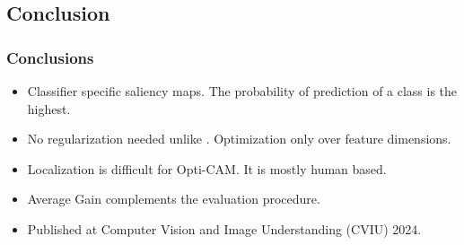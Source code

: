 \subsection*{Conclusion}
\begin{frame}
    \frametitle{Conclusions}
    \small
    \begin{itemize}
        \item Classifier specific saliency maps. The probability of prediction of a class is the highest.
        \item No regularization needed unlike \cite{fong2017interpretable,fong2019understanding}. 
        Optimization only over feature dimensions.
        \item Localization is difficult for Opti-CAM. It is mostly human based.
        \item Average Gain complements the evaluation procedure. 
        \item Published at Computer Vision and Image Understanding (CVIU) 2024.
    \end{itemize}
\end{frame}